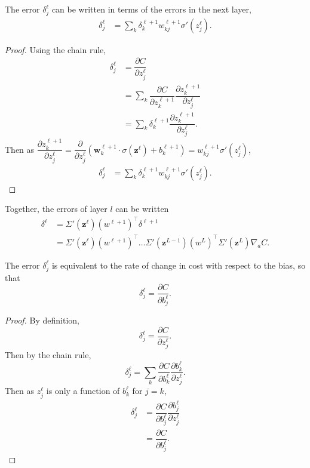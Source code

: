 \begin{proposition}
	The error $\delta^\ell_j$ can be written in terms of the errors in the next layer, 
	\begin{align*}
		\delta_j^\ell & = \sum_k\delta_k^{\ell+1}w_{kj}^{\ell+1}\sigma'(z_j^\ell).
	\end{align*}
\end{proposition}

\begin{proof}
	Using the chain rule,
	\begin{align*}
		\delta_j^\ell & = \dfrac{\partial C}{\partial z_j^\ell} \\
		& = \sum_k\dfrac{\partial C}{\partial z_k^{\ell+1}}\dfrac{\partial z_k^{\ell+1}}{\partial z_j^\ell} \\
		& = \sum_k\delta_k^{\ell+1}\dfrac{\partial z_k^{\ell+1}}{\partial z_j^\ell}.
	\end{align*}
	Then as $\dfrac{\partial z_k^{\ell+1}}{\partial z_j^\ell} = \dfrac{\partial}{\partial z_j^\ell}(\mathbf{w}_k^{\ell+1}\cdot\sigma(\mathbf{z}^\ell) + b_k^{\ell+1}) = w_{kj}^{\ell+1}\sigma'(z_j^\ell)$,
	\begin{align*}
		\delta_j^\ell & = \sum_k\delta_k^{\ell+1}w_{kj}^{\ell+1}\sigma'(z_j^\ell).
	\end{align*}
\end{proof}


Together, the errors of layer $l$ can be written
\begin{align*}
	\delta^\ell & = \Sigma'(\mathbf{z}^\ell)(w^{\ell+1})^\intercal\delta^{\ell+1} \\
	& = \Sigma'(\mathbf{z}^\ell)(w^{\ell+1})^\intercal\ldots\Sigma'(\mathbf{z}^{L-1})(w^L)^\intercal\Sigma'(\mathbf{z}^L)\nabla_aC.
\end{align*}

\begin{proposition}
	The error $\delta_j^\ell$ is equivalent to the rate of change in cost with respect to the bias, so that
	\[
		\delta_j^\ell = \dfrac{\partial C}{\partial b_j^\ell}.
	\]
\end{proposition}
\begin{proof}
	By definition,
	\[
		\delta_j^\ell = \dfrac{\partial C}{\partial z_j^\ell}.
	\]
	Then by the chain rule,
	\[
		\delta_j^\ell = \sum_k\dfrac{\partial C}{\partial b_k^\ell}\dfrac{\partial b_k^\ell}{\partial z_j^\ell}.
	\]
	Then as $z_j^\ell$ is only a function of $b_k^\ell$ for $j = k$,
	\begin{align*}
		\delta_j^\ell & = \dfrac{\partial C}{\partial b_j^\ell}\dfrac{\partial b_j^\ell}{\partial z_j^\ell} \\
		& = \dfrac{\partial C}{\partial b_j^\ell}.
	\end{align*}
\end{proof}

